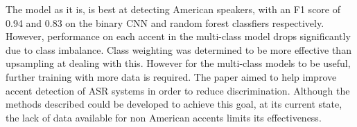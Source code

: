 \documentclass[conference]{IEEEtran}
\begin{document}
The model as it is, is best at detecting American speakers, with an F1 score of 0.94 and 0.83 on the binary CNN and random forest classfiers respectively. However, performance on each accent in the multi-class model drops significantly due to class imbalance. Class weighting was determined to be more effective than upsampling at dealing with this. However for the multi-class models to be useful, further training with more data is required. 
The paper aimed to help improve accent detection of ASR systems in order to reduce discrimination. Although the methods described could be developed to achieve this goal, at its current state, the lack of data available for non American accents limits its effectiveness.


\printbibliography
\end{document}
